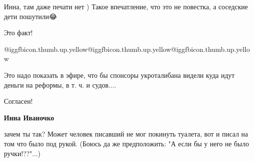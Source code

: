 \begin{itemize}
Инна, там даже печати нет )
Такое впечатление, что это не повестка, а соседские дети пошутили😂

 
Это факт!

 
@igg{fbicon.thumb.up.yellow}@igg{fbicon.thumb.up.yellow}@igg{fbicon.thumb.up.yellow}🌹

 
Это надо показать в эфире, что бы спонсоры укроталибана видели куда идут деньги на реформы, в т. ч. и судов....

 
Согласен!🤔

 
\textbf{Инна Иваночко} 

зачем ты так? Может человек писавший не мог покинуть туалета, вот и писал на
том что было под рукой. (Боюсь да же предположить: "А если бы у него не было
ручки!??"...)


 

\end{itemize}
